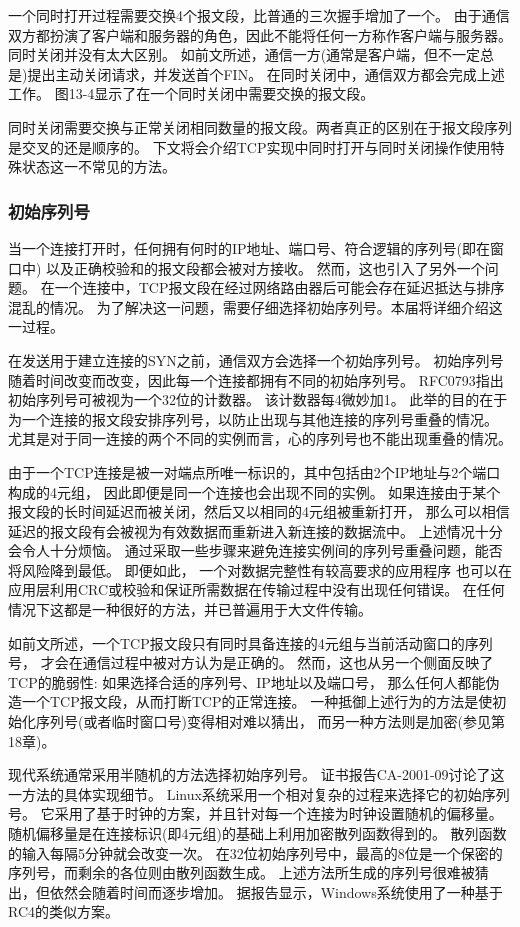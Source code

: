\documentclass{../main.tex}{subfiles}
\begin{document}
一个同时打开过程需要交换4个报文段，比普通的三次握手增加了一个。
由于通信双方都扮演了客户端和服务器的角色，因此不能将任何一方称作客户端与服务器。
同时关闭并没有太大区别。
如前文所述，通信一方(通常是客户端，但不一定总是)提出主动关闭请求，并发送首个FIN。
在同时关闭中，通信双方都会完成上述工作。
图13-4显示了在一个同时关闭中需要交换的报文段。

同时关闭需要交换与正常关闭相同数量的报文段。两者真正的区别在于报文段序列是交叉的还是顺序的。
下文将会介绍TCP实现中同时打开与同时关闭操作使用特殊状态这一不常见的方法。

\subsubsection{初始序列号}
当一个连接打开时，任何拥有何时的IP地址、端口号、符合逻辑的序列号(即在窗口中)
以及正确校验和的报文段都会被对方接收。
然而，这也引入了另外一个问题。
在一个连接中，TCP报文段在经过网络路由器后可能会存在延迟抵达与排序混乱的情况。
为了解决这一问题，需要仔细选择初始序列号。本届将详细介绍这一过程。

在发送用于建立连接的SYN之前，通信双方会选择一个初始序列号。
初始序列号随着时间改变而改变，因此每一个连接都拥有不同的初始序列号。
RFC0793指出初始序列号可被视为一个32位的计数器。
该计数器每4微妙加1。
此举的目的在于为一个连接的报文段安排序列号，以防止出现与其他连接的序列号重叠的情况。
尤其是对于同一连接的两个不同的实例而言，心的序列号也不能出现重叠的情况。

由于一个TCP连接是被一对端点所唯一标识的，其中包括由2个IP地址与2个端口构成的4元组，
因此即便是同一个连接也会出现不同的实例。
如果连接由于某个报文段的长时间延迟而被关闭，然后又以相同的4元组被重新打开，
那么可以相信延迟的报文段有会被视为有效数据而重新进入新连接的数据流中。
上述情况十分会令人十分烦恼。
通过采取一些步骤来避免连接实例间的序列号重叠问题，能否将风险降到最低。
即便如此，
一个对数据完整性有较高要求的应用程序
也可以在应用层利用CRC或校验和保证所需数据在传输过程中没有出现任何错误。
在任何情况下这都是一种很好的方法，并已普遍用于大文件传输。

如前文所述，一个TCP报文段只有同时具备连接的4元组与当前活动窗口的序列号，
才会在通信过程中被对方认为是正确的。
然而，这也从另一个侧面反映了TCP的脆弱性:
如果选择合适的序列号、IP地址以及端口号，
那么任何人都能伪造一个TCP报文段，从而打断TCP的正常连接。
一种抵御上述行为的方法是使初始化序列号(或者临时窗口号)变得相对难以猜出，
而另一种方法则是加密(参见第18章)。

现代系统通常采用半随机的方法选择初始序列号。
证书报告CA-2001-09讨论了这一方法的具体实现细节。
Linux系统采用一个相对复杂的过程来选择它的初始序列号。
它采用了基于时钟的方案，并且针对每一个连接为时钟设置随机的偏移量。
随机偏移量是在连接标识(即4元组)的基础上利用加密散列函数得到的。
散列函数的输入每隔5分钟就会改变一次。
在32位初始序列号中，最高的8位是一个保密的序列号，而剩余的各位则由散列函数生成。
上述方法所生成的序列号很难被猜出，但依然会随着时间而逐步增加。
据报告显示，Windows系统使用了一种基于RC4的类似方案。
\end{document}
